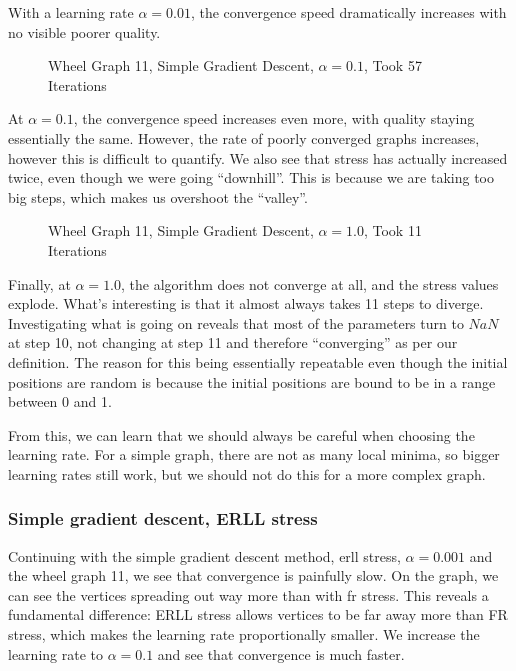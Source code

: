 \documentclass[12pt]{article}
\begin{document}
With a learning rate $\alpha=0.01$, the convergence speed dramatically increases with no visible poorer quality.

\begin{figure}[H]
\centering

\caption{\label{wheel-graph-alpha-0.1} Wheel Graph 11, Simple Gradient Descent, $\alpha=0.1$, Took 57 Iterations}
\end{figure}

At $\alpha=0.1$, the convergence speed increases even more, with quality staying essentially the same.
However, the rate of poorly converged graphs increases, however this is difficult to quantify.
We also see that stress has actually increased twice, even though we were going ``downhill''.
This is because we are taking too big steps, which makes us overshoot the ``valley''.

\begin{figure}[H]
\centering

\caption{\label{wheel-graph-alpha-1.0} Wheel Graph 11, Simple Gradient Descent, $\alpha=1.0$, Took 11 Iterations}
\end{figure}

Finally, at $\alpha=1.0$, the algorithm does not converge at all, and the stress values explode.
What's interesting is that it almost always takes 11 steps to diverge.
Investigating what is going on reveals that most of the parameters turn to $NaN$ at step 10, not changing at step 11 and therefore ``converging'' as per our definition.
The reason for this being essentially repeatable even though the initial positions are random
is because the initial positions are bound to be in a range between 0 and 1.

From this, we can learn that we should always be careful when choosing the learning rate.
For a simple graph, there are not as many local minima, so bigger learning rates still work,
but we should not do this for a more complex graph.

\subsubsection{Simple gradient descent, ERLL stress}

Continuing with the simple gradient descent method, erll stress, $\alpha=0.001$ and the wheel graph 11,
we see that convergence is painfully slow. On the graph, we can see the vertices spreading out
way more than with fr stress. This reveals a fundamental difference:
ERLL stress allows vertices to be far away more than FR stress, which makes the learning rate proportionally smaller.
We increase the learning rate to $\alpha=0.1$ and see that convergence is much faster.
\end{document}
